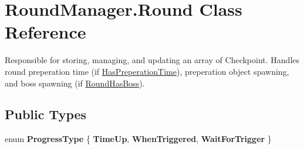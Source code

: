 \hypertarget{class_round_manager_1_1_round}{}\section{Round\+Manager.\+Round Class Reference}
\label{class_round_manager_1_1_round}


Responsible for storing, managing, and updating an array of Checkpoint. Handles round preperation time (if \hyperlink{class_round_manager_1_1_round_a711e1825e6d269ab0308a79cf25ee8d1}{Has\+Preperation\+Time}), preperation object spawning, and boss spawning (if \hyperlink{class_round_manager_1_1_round_a3e8205a74f196546906314f802f41127}{Round\+Has\+Boss}).  


\subsection*{Public Types}
\begin{DoxyCompactItemize}
\item 
\hypertarget{class_round_manager_1_1_round_aa29bc68e0391d65a999897ea1e6a20ae}{}enum {\bfseries Progress\+Type} \{ {\bfseries Time\+Up}, 
{\bfseries When\+Triggered}, 
{\bfseries Wait\+For\+Trigger}
 \}\label{class_round_manager_1_1_round_aa29bc68e0391d65a999897ea1e6a20ae}

\end{DoxyCompactItemize}
